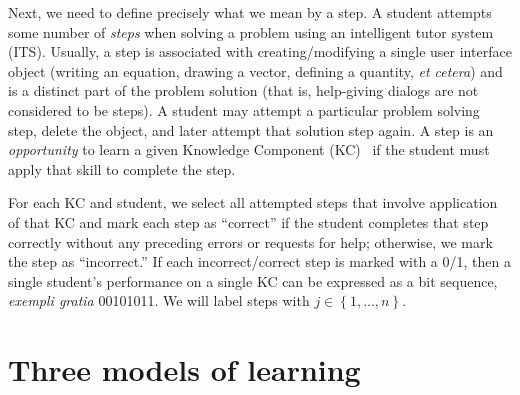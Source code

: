 \documentclass{edm_template}
\begin{document}
Next,  we need to define
precisely what we mean by a step.
A student attempts some number of {\em steps} when solving a problem
using an intelligent tutor system (ITS).
Usually, a step is associated with creating/modifying a single user
interface object (writing an equation, drawing a vector, defining a
quantity, {\em et cetera}) and is a distinct part of the problem
solution (that is, help-giving dialogs are not considered to be
steps).  A student may attempt a particular problem solving step,
delete the object, and later attempt that solution step again.  A step
is an {\em opportunity} to learn a given Knowledge Component
(KC)~\cite{vanlehn_behavior_2006} if the student must apply that skill
to complete the step.

%
%

For each KC and student, we select all attempted steps that involve application
of that KC and mark each step as ``correct'' if
the student completes that step correctly without any preceding errors or 
requests for help; otherwise, we mark the step as ``incorrect.''
\label{steps}  %
If each incorrect/correct step is marked with a 0/1, then
a single student's performance on a single KC can be expressed as a bit  sequence,
{\em exempli gratia} 00101011.  We will label
steps with $j\in\left\{1,\ldots,n\right\}$.  

\section{Three models of learning}
\end{document}
